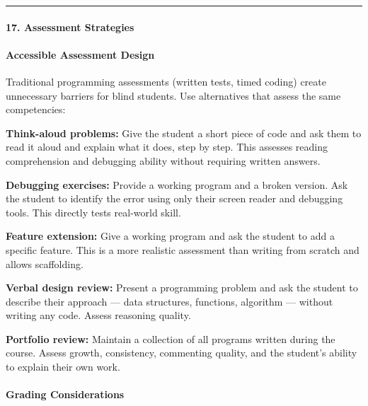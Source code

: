 \documentclass[
  justified,
  openright,
]{tufte-book}
\let\subsection\paragraph
\let\paragraph\paragraph
\let\subsection\paragraph
\let\paragraph\paragraph
\begin{document}
\begin{center}\rule{0.5\linewidth}{0.5pt}\end{center}

\subsection{17. Assessment Strategies}\label{assessment-strategies}

\subsection{Accessible Assessment
Design}\label{accessible-assessment-design}

Traditional programming assessments (written tests, timed coding) create
unnecessary barriers for blind students. Use alternatives that assess
the same competencies:

\textbf{Think-aloud problems:} Give the student a short piece of code
and ask them to read it aloud and explain what it does, step by step.
This assesses reading comprehension and debugging ability without
requiring written answers.

\textbf{Debugging exercises:} Provide a working program and a broken
version. Ask the student to identify the error using only their screen
reader and debugging tools. This directly tests real-world skill.

\textbf{Feature extension:} Give a working program and ask the student
to add a specific feature. This is a more realistic assessment than
writing from scratch and allows scaffolding.

\textbf{Verbal design review:} Present a programming problem and ask the
student to describe their approach --- data structures, functions,
algorithm --- without writing any code. Assess reasoning quality.

\textbf{Portfolio review:} Maintain a collection of all programs written
during the course. Assess growth, consistency, commenting quality, and
the student's ability to explain their own work.

\subsection{Grading Considerations}\label{grading-considerations}
\end{document}
